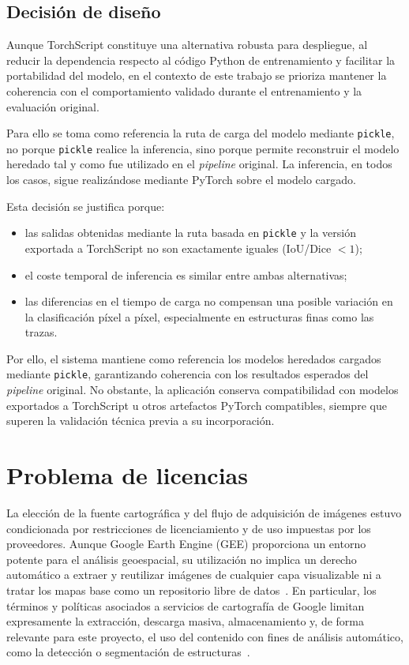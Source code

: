 \subsection{Decisión de diseño}

Aunque TorchScript constituye una alternativa robusta para despliegue, al reducir la dependencia respecto al código Python de entrenamiento y facilitar la portabilidad del modelo, en el contexto de este trabajo se prioriza mantener la coherencia con el comportamiento validado durante el entrenamiento y la evaluación original. 

Para ello se toma como referencia la ruta de carga del modelo mediante \texttt{pickle}, no porque \texttt{pickle} realice la inferencia, sino porque permite reconstruir el modelo heredado tal y como fue utilizado en el \textit{pipeline} original. La inferencia, en todos los casos, sigue realizándose mediante PyTorch sobre el modelo cargado.

Esta decisión se justifica porque:
\begin{itemize}
	\item las salidas obtenidas mediante la ruta basada en \texttt{pickle} y la versión exportada a TorchScript no son exactamente iguales (IoU/Dice $< 1$);
	\item el coste temporal de inferencia es similar entre ambas alternativas;
	\item las diferencias en el tiempo de carga no compensan una posible variación en la clasificación píxel a píxel, especialmente en estructuras finas como las trazas.
\end{itemize}

Por ello, el sistema mantiene como referencia los modelos heredados cargados mediante \texttt{pickle}, garantizando coherencia con los resultados esperados del \textit{pipeline} original. No obstante, la aplicación conserva compatibilidad con modelos exportados a TorchScript u otros artefactos PyTorch compatibles, siempre que superen la validación técnica previa a su incorporación.

\section{Problema de licencias}

La elección de la fuente cartográfica y del flujo de adquisición de imágenes estuvo condicionada por restricciones de licenciamiento y de uso impuestas por los proveedores. Aunque Google Earth Engine (GEE) proporciona un entorno potente para el análisis geoespacial, su utilización no implica un derecho automático a extraer y reutilizar imágenes de cualquier capa visualizable ni a tratar los mapas base como un repositorio libre de datos~\cite{googleearthengine_terms}. En particular, los términos y políticas asociados a servicios de cartografía de Google limitan expresamente la extracción, descarga masiva, almacenamiento y, de forma relevante para este proyecto, el uso del contenido con fines de análisis automático, como la detección o segmentación de estructuras~\cite{googlemaps_platform_terms}.

